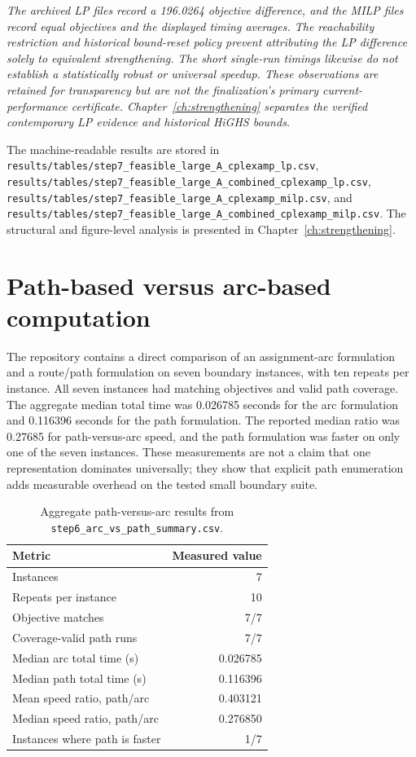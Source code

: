 \textit{The archived LP files record a 196.0264 objective difference, and the
MILP files record equal objectives and the displayed timing averages. The
reachability restriction and historical bound-reset policy prevent attributing
the LP difference solely to equivalent strengthening. The short single-run
timings likewise do not establish a statistically robust or universal speedup.
These observations are retained for transparency but are not the finalization's
primary current-performance certificate. Chapter~\ref{ch:strengthening}
separates the verified contemporary LP evidence and historical HiGHS bounds.}

The machine-readable results are stored in
\texttt{results/tables/step7\_feasible\_large\_A\_cplexamp\_lp.csv},
\texttt{results/tables/step7\_feasible\_large\_A\_combined\_cplexamp\_lp.csv},
\texttt{results/tables/step7\_feasible\_large\_A\_cplexamp\_milp.csv}, and
\texttt{results/tables/step7\_feasible\_large\_A\_combined\_cplexamp\_milp.csv}.
The structural and figure-level analysis is presented in Chapter~\ref{ch:strengthening}.

\section{Path-based versus arc-based computation}
\label{sec:computational_path_arc}

The repository contains a direct comparison of an assignment-arc formulation
and a route/path formulation on seven boundary instances, with ten repeats per
instance. All seven instances had matching objectives and valid path coverage.
The aggregate median total time was 0.026785 seconds for the arc formulation
and 0.116396 seconds for the path formulation. The reported median ratio was
0.27685 for path-versus-arc speed, and the path formulation was
faster on only one of the seven instances. These measurements are not a claim
that one representation dominates universally; they show that explicit path
enumeration adds measurable overhead on the tested small boundary suite.

\begin{table}[t]
\centering\small
\caption{Aggregate path-versus-arc results from
\texttt{step6\_arc\_vs\_path\_summary.csv}.}
\label{tab:path_arc_aggregate}
\begin{tabular}{lr}
\toprule
Metric & Measured value \\
\midrule
Instances & 7 \\
Repeats per instance & 10 \\
Objective matches & 7/7 \\
Coverage-valid path runs & 7/7 \\
Median arc total time (s) & 0.026785 \\
Median path total time (s) & 0.116396 \\
Mean speed ratio, path/arc & 0.403121 \\
Median speed ratio, path/arc & 0.276850 \\
Instances where path is faster & 1/7 \\
\bottomrule
\end{tabular}
\end{table}

